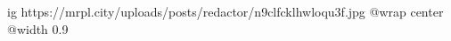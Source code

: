  
 
 
 
 

\ifcmt
  ig https://mrpl.city/uploads/posts/redactor/n9clfcklhwloqu3f.jpg
  @wrap center
  @width 0.9
\fi
